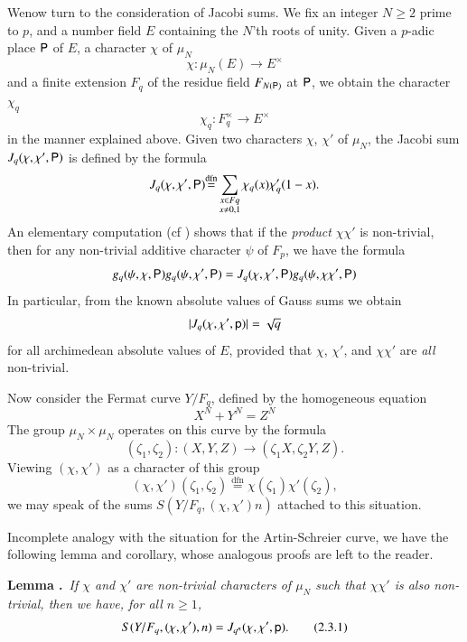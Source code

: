We\pageoriginale now turn to the consideration of Jacobi sums. We fix an integer $N\geq 2$ prime to $p$, and a number field $E$ containing the $N$'th roots of unity. Given a $p$-adic place $\mathsf{P}$ of $E$, a character $\chi$ of $\mu_{N}$
$$
\chi :\mu_{N}(E)\to E^{\times}
$$
and a finite extension $F_{q}$ of the residue field $F_{N(\mathsf{P})}$ at $\mathsf{P}$, we obtain the character $\chi_{q}$
$$
\chi_{q}:F^{\times}_{q}\to E^{\times}
$$
in the manner explained above. Given two characters $\chi$, $\chi'$ of $\mu_{N}$, the Jacobi sum $J_{q}(\chi,\chi',\mathsf{P})$ is defined by the formula
$$
J_{q}(\chi,\chi',\mathsf{P}) {\displaystyle{\mathop{=}\limits^{\text{dfn}}}}\sum\limits_{\substack{x\in Fq\\ x\neq 0,1}}\chi_{q}(x)\chi'_{q}(1-x).
$$
An elementary computation (cf \cite{art6-key14}) shows that if the {\em product} $\chi\chi'$ is non-trivial, then for any non-trivial additive character $\psi$ of $F_{p}$, we have the formula
$$
g_{q}(\psi,\chi,\mathsf{P})g_{q}(\psi,\chi',\mathsf{P})=J_{q}(\chi,\chi',\mathsf{P})g_{q}(\psi,\chi\chi',\mathsf{P})
$$
In particular, from the known absolute values of Gauss sums we obtain
$$
|J_{q}(\chi,\chi',\mathsf{p})|=\sqrt{q}
$$
for all archimedean absolute values of $E$, provided that $\chi$, $\chi'$, and $\chi\chi'$ are {\em all} non-trivial.

Now consider the Fermat curve $Y/F_{q}$, defined by the homogeneous equation
$$
X^{N}+Y^{N}=Z^{N}
$$
The group $\mu_{N}\times \mu_{N}$ operates on this curve by the formula
$$
(\zeta_{1},\zeta_{2}):(X,Y,Z)\to (\zeta_{1}X,\zeta_{2}Y,Z).
$$
Viewing $(\chi,\chi')$ as a character of this group
$$
(\chi,\chi')(\zeta_{1},\zeta_{2}) {\displaystyle{\mathop{=}\limits^{\text{dfn}}}}\chi(\zeta_{1})\chi'(\zeta_{2}),
$$
we may speak of the sums $S(Y/F_{q},(\chi,\chi')n)$ attached to this situation.

In\pageoriginale complete analogy with the situation for the Artin-Schreier curve, we have the following lemma and corollary, whose analogous proofs are left to the reader.

\medskip
\noindent
{\bf Lemma .\label{art6-lem2.3}}~{\em If $\chi$ and $\chi'$ are non-trivial characters of $\mu_{N}$ such that $\chi\chi'$ is also non-trivial, then we have, for all $n\geq 1$,}
\begin{equation*}
S(Y/F_{q},(\chi,\chi'),n)=J_{q^{n}}(\chi,\chi',\mathsf{p}).\tag{2.3.1}\label{art6-eq2.3.1}
\end{equation*}
\smallskip

